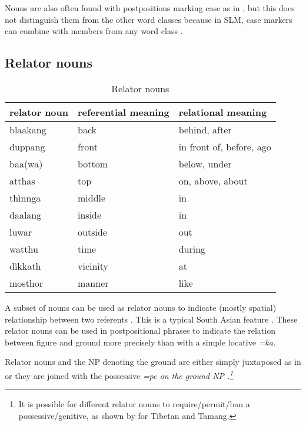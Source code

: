 Nouns are also often found with postpositions marking case as in , but this does not distinguish them from the other word classes because in SLM, case markers can combine with members from any word class .



\subsection{Relator nouns}\label{sec:wc:Relatornouns}
\begin{table}
	\centering
		  \begin{tabular}{lll}
			relator noun & referential meaning & relational meaning\\
\hline
  			blaakang & back & behind, after\\
  			duppang & front & in front of, before, ago\\
			baa(wa)   & bottom & below, under\\
			atthas & top & on, above, about\\
			thìnnga & middle & in\\
			daalang & inside & in\\
			luwar & outside & out\\
			watthu & time & during\\
			dìkkath & vicinity & at\\
			mosthor & manner & like\\
  		\end{tabular}
 			\caption{Relator nouns}
  		\label{tab:RelatorNouns}
\end{table}

A subset of nouns can be used as relator nouns \citep{Starosta1985, DeLancey1997relator} to indicate (mostly spatial) relationship between two referents \citep[25]{Adelaar1991}. This is a typical South Asian feature \citep[23]{Masica1976}.
These relator nouns can be used in postpositional phrases to indicate the relation between figure and ground more precisely than with a simple locative \em =ka\em.

Relator nouns and the NP denoting the ground are either simply juxtaposed as in  or they are joined with the possessive \em =pe \em on the ground NP .\footnote{It is possible for different  relator nouns to require/permit/ban a  possessive/genitive, as shown  by \citet{DeLancey1997relator} for Tibetan and Tamang.}

